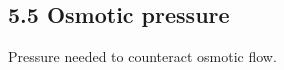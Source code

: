 \subsection{5.5 Osmotic pressure}
    Pressure needed to counteract osmotic flow.
    \vspace*{-0.5em}
